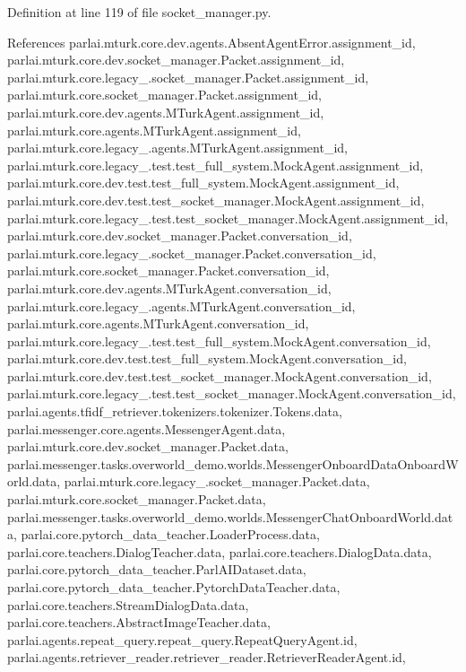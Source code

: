 Definition at line 119 of file socket\+\_\+manager.\+py.



References parlai.\+mturk.\+core.\+dev.\+agents.\+Absent\+Agent\+Error.\+assignment\+\_\+id, parlai.\+mturk.\+core.\+dev.\+socket\+\_\+manager.\+Packet.\+assignment\+\_\+id, parlai.\+mturk.\+core.\+legacy\+\_.\+socket\+\_\+manager.\+Packet.\+assignment\+\_\+id, parlai.\+mturk.\+core.\+socket\+\_\+manager.\+Packet.\+assignment\+\_\+id, parlai.\+mturk.\+core.\+dev.\+agents.\+M\+Turk\+Agent.\+assignment\+\_\+id, parlai.\+mturk.\+core.\+agents.\+M\+Turk\+Agent.\+assignment\+\_\+id, parlai.\+mturk.\+core.\+legacy\+\_.\+agents.\+M\+Turk\+Agent.\+assignment\+\_\+id, parlai.\+mturk.\+core.\+legacy\+\_.\+test.\+test\+\_\+full\+\_\+system.\+Mock\+Agent.\+assignment\+\_\+id, parlai.\+mturk.\+core.\+dev.\+test.\+test\+\_\+full\+\_\+system.\+Mock\+Agent.\+assignment\+\_\+id, parlai.\+mturk.\+core.\+dev.\+test.\+test\+\_\+socket\+\_\+manager.\+Mock\+Agent.\+assignment\+\_\+id, parlai.\+mturk.\+core.\+legacy\+\_.\+test.\+test\+\_\+socket\+\_\+manager.\+Mock\+Agent.\+assignment\+\_\+id, parlai.\+mturk.\+core.\+dev.\+socket\+\_\+manager.\+Packet.\+conversation\+\_\+id, parlai.\+mturk.\+core.\+legacy\+\_.\+socket\+\_\+manager.\+Packet.\+conversation\+\_\+id, parlai.\+mturk.\+core.\+socket\+\_\+manager.\+Packet.\+conversation\+\_\+id, parlai.\+mturk.\+core.\+dev.\+agents.\+M\+Turk\+Agent.\+conversation\+\_\+id, parlai.\+mturk.\+core.\+legacy\+\_.\+agents.\+M\+Turk\+Agent.\+conversation\+\_\+id, parlai.\+mturk.\+core.\+agents.\+M\+Turk\+Agent.\+conversation\+\_\+id, parlai.\+mturk.\+core.\+legacy\+\_.\+test.\+test\+\_\+full\+\_\+system.\+Mock\+Agent.\+conversation\+\_\+id, parlai.\+mturk.\+core.\+dev.\+test.\+test\+\_\+full\+\_\+system.\+Mock\+Agent.\+conversation\+\_\+id, parlai.\+mturk.\+core.\+dev.\+test.\+test\+\_\+socket\+\_\+manager.\+Mock\+Agent.\+conversation\+\_\+id, parlai.\+mturk.\+core.\+legacy\+\_.\+test.\+test\+\_\+socket\+\_\+manager.\+Mock\+Agent.\+conversation\+\_\+id, parlai.\+agents.\+tfidf\+\_\+retriever.\+tokenizers.\+tokenizer.\+Tokens.\+data, parlai.\+messenger.\+core.\+agents.\+Messenger\+Agent.\+data, parlai.\+mturk.\+core.\+dev.\+socket\+\_\+manager.\+Packet.\+data, parlai.\+messenger.\+tasks.\+overworld\+\_\+demo.\+worlds.\+Messenger\+Onboard\+Data\+Onboard\+World.\+data, parlai.\+mturk.\+core.\+legacy\+\_.\+socket\+\_\+manager.\+Packet.\+data, parlai.\+mturk.\+core.\+socket\+\_\+manager.\+Packet.\+data, parlai.\+messenger.\+tasks.\+overworld\+\_\+demo.\+worlds.\+Messenger\+Chat\+Onboard\+World.\+data, parlai.\+core.\+pytorch\+\_\+data\+\_\+teacher.\+Loader\+Process.\+data, parlai.\+core.\+teachers.\+Dialog\+Teacher.\+data, parlai.\+core.\+teachers.\+Dialog\+Data.\+data, parlai.\+core.\+pytorch\+\_\+data\+\_\+teacher.\+Parl\+A\+I\+Dataset.\+data, parlai.\+core.\+pytorch\+\_\+data\+\_\+teacher.\+Pytorch\+Data\+Teacher.\+data, parlai.\+core.\+teachers.\+Stream\+Dialog\+Data.\+data, parlai.\+core.\+teachers.\+Abstract\+Image\+Teacher.\+data, parlai.\+agents.\+repeat\+\_\+query.\+repeat\+\_\+query.\+Repeat\+Query\+Agent.\+id, parlai.\+agents.\+retriever\+\_\+reader.\+retriever\+\_\+reader.\+Retriever\+Reader\+Agent.\+id, 